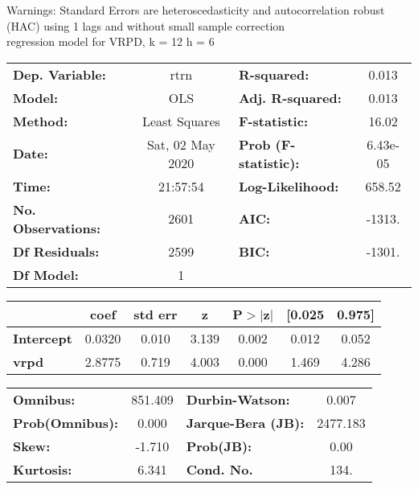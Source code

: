 Warnings: \newline
 [1] Standard Errors are heteroscedasticity and autocorrelation robust (HAC) using 1 lags and without small sample correction\\ 

regression model for VRPD, k = 12 h = 6\begin{center}
\begin{tabular}{lclc}
\toprule
\textbf{Dep. Variable:}    &       rtrn       & \textbf{  R-squared:         } &     0.013   \\
\textbf{Model:}            &       OLS        & \textbf{  Adj. R-squared:    } &     0.013   \\
\textbf{Method:}           &  Least Squares   & \textbf{  F-statistic:       } &     16.02   \\
\textbf{Date:}             & Sat, 02 May 2020 & \textbf{  Prob (F-statistic):} &  6.43e-05   \\
\textbf{Time:}             &     21:57:54     & \textbf{  Log-Likelihood:    } &    658.52   \\
\textbf{No. Observations:} &        2601      & \textbf{  AIC:               } &    -1313.   \\
\textbf{Df Residuals:}     &        2599      & \textbf{  BIC:               } &    -1301.   \\
\textbf{Df Model:}         &           1      & \textbf{                     } &             \\
\bottomrule
\end{tabular}
\begin{tabular}{lcccccc}
                   & \textbf{coef} & \textbf{std err} & \textbf{z} & \textbf{P$> |$z$|$} & \textbf{[0.025} & \textbf{0.975]}  \\
\midrule
\textbf{Intercept} &       0.0320  &        0.010     &     3.139  &         0.002        &        0.012    &        0.052     \\
\textbf{vrpd}      &       2.8775  &        0.719     &     4.003  &         0.000        &        1.469    &        4.286     \\
\bottomrule
\end{tabular}
\begin{tabular}{lclc}
\textbf{Omnibus:}       & 851.409 & \textbf{  Durbin-Watson:     } &    0.007  \\
\textbf{Prob(Omnibus):} &   0.000 & \textbf{  Jarque-Bera (JB):  } & 2477.183  \\
\textbf{Skew:}          &  -1.710 & \textbf{  Prob(JB):          } &     0.00  \\
\textbf{Kurtosis:}      &   6.341 & \textbf{  Cond. No.          } &     134.  \\
\bottomrule
\end{tabular}
\end{center}

